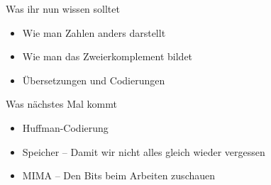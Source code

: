 %

\begin{frame}	
	\begin{block}{Was ihr nun wissen solltet}
		\begin{itemize}
			\item Wie man Zahlen anders darstellt
			\item Wie man das Zweierkomplement bildet
			\item Übersetzungen und Codierungen
		\end{itemize}
	\end{block}
	
	\begin{block}{Was nächstes Mal kommt}
		\begin{itemize}
			\item Huffman-Codierung
			\item Speicher -- Damit wir nicht alles gleich wieder vergessen
			\item MIMA -- Den Bits beim Arbeiten zuschauen
		\end{itemize}
	\end{block}
\end{frame}


\slideThanks

